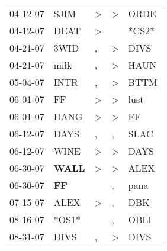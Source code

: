 \begin{supertabular}{p{0.07\textwidth}p{0.06\textwidth}p{0.02\textwidth}p{0.02\textwidth}p{0.06\textwidth}}
          04-12-07\textsuperscript{} &           SJIM\textsuperscript{} &     \textgreater &     \textgreater &           ORDE\textsuperscript{} \\
          04-12-07\textsuperscript{} &           DEAT\textsuperscript{} &     \textgreater &                  &                            *CS2* \\
          04-21-07\textsuperscript{} &           3WID\textsuperscript{} &                , &     \textgreater &           DIVS\textsuperscript{} \\
          04-21-07\textsuperscript{} &           milk\textsuperscript{} &                , &     \textgreater &           HAUN\textsuperscript{} \\
          05-04-07\textsuperscript{} &           INTR\textsuperscript{} &                , &     \textgreater &           BTTM\textsuperscript{} \\
          06-01-07\textsuperscript{} &             FF\textsuperscript{} &     \textgreater &     \textgreater &           lust\textsuperscript{} \\
          06-01-07\textsuperscript{} &           HANG\textsuperscript{} &     \textgreater &     \textgreater &             FF\textsuperscript{} \\
          06-12-07\textsuperscript{} &           DAYS\textsuperscript{} &                , &                , &           SLAC\textsuperscript{} \\
          06-12-07\textsuperscript{} &           WINE\textsuperscript{} &     \textgreater &     \textgreater &           DAYS\textsuperscript{} \\
          06-30-07\textsuperscript{} &  \textbf{WALL\textsuperscript{}} &     \textgreater &     \textgreater &           ALEX\textsuperscript{} \\
          06-30-07\textsuperscript{} &    \textbf{FF\textsuperscript{}} &                  &                , &           pana\textsuperscript{} \\
          07-15-07\textsuperscript{} &           ALEX\textsuperscript{} &     \textgreater &                , &            DBK\textsuperscript{} \\
          08-16-07\textsuperscript{} &                            *OS1* &                  &                , &           OBLI\textsuperscript{} \\
          08-31-07\textsuperscript{} &           DIVS\textsuperscript{} &                , &     \textgreater &           DIVS\textsuperscript{} \\

\end{supertabular}

